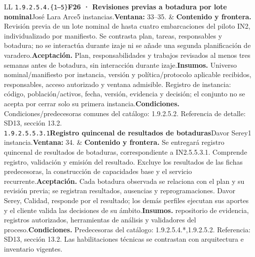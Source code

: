 \begin{longtable}{L{\tabcolsep\relax}L{\tabcolsep\relax}}
\texttt{1.\allowbreak{}9.\allowbreak{}2.\allowbreak{}5.\allowbreak{}4.\allowbreak{}\{1--5\}}\newline{}\textbf{F26 · Revisiones previas a botadura por lote nominal}\newline{}José Lara Arce\newline{}5 instancias.\newline{}\textbf{Ventana:} 33--35. & \textbf{Contenido y frontera.} Revisión previa de un lote nominal de hasta cuatro embarcaciones del piloto IN2, individualizado por manifiesto. Se contrasta plan, tareas, responsables y botadura; no se interactúa durante izaje ni se añade una segunda planificación de varadero.\newline{}\textbf{Aceptación.} Plan, responsabilidades y trabajos revisados al menos tres semanas antes de botadura, sin interacción durante izaje.\newline{}\textbf{Insumos.} Universo nominal/manifiesto por instancia, versión y política/protocolo aplicable recibidos, responsables, acceso autorizado y ventana admisible. Registro de instancia: código, población/activos, fecha, versión, evidencia y decisión; el conjunto no se acepta por cerrar solo su primera instancia.\newline{}\textbf{Condiciones.} Condiciones/predecesoras comunes del catálogo: 1.9.2.5.2. Referencia de detalle: SD13, sección 13.2.\\\hline
\texttt{1.\allowbreak{}9.\allowbreak{}2.\allowbreak{}5.\allowbreak{}5.\allowbreak{}3.\allowbreak{}1}\newline{}\textbf{Registro quincenal de resultados de botaduras}\newline{}Davor Serey\newline{}1 instancia.\newline{}\textbf{Ventana:} 34. & \textbf{Contenido y frontera.} Se entregará registro quincenal de resultados de botaduras, correspondiente a IN2.5.5.3.1. Comprende registro, validación y emisión del resultado. Excluye los resultados de las fichas predecesoras, la construcción de capacidades base y el servicio recurrente.\newline{}\textbf{Aceptación.} Cada botadura observada se relaciona con el plan y su revisión previa; se registran resultados, ausencias y reprogramaciones. Davor Serey, Calidad, responde por el resultado; los demás perfiles ejecutan sus aportes y el cliente valida las decisiones de su ámbito.\newline{}\textbf{Insumos.} repositorio de evidencia, registros autorizados, herramientas de análisis y validadores del proceso.\newline{}\textbf{Condiciones.} Predecesoras del catálogo: 1.9.2.5.4.*,1.9.2.5.2. Referencia: SD13, sección 13.2. Las habilitaciones técnicas se contrastan con arquitectura e inventario vigentes.\\\hline

\end{longtable}
